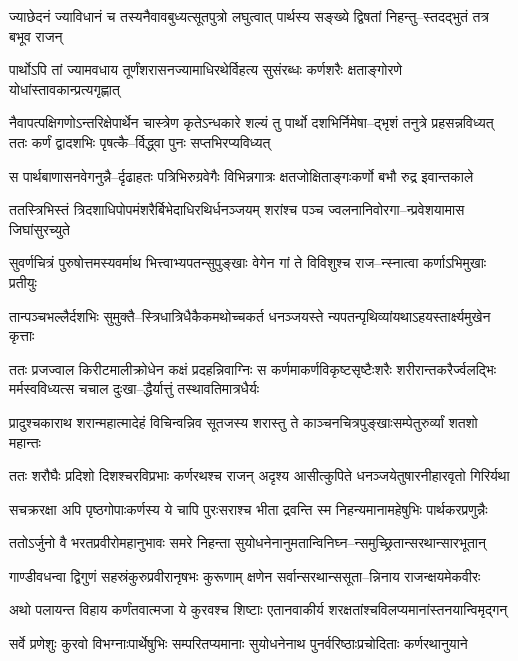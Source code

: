 \twolineshloka
{ज्याछेदनं ज्याविधानं च तस्यनैवावबुध्यत्सूतपुत्रो लघुत्वात्}
{पार्थस्य सङ्ख्ये द्विषतां निहन्तु--स्तदद्भुतं तत्र बभूव राजन्}


\twolineshloka
{पार्थोऽपि तां ज्यामवधाय तूर्णंशरासनज्यामाधिरथेर्विहत्य}
{सुसंरब्धः कर्णशरैः क्षताङ्गोरणे योधांस्तावकान्प्रत्यगृह्णात्}


नैवापत्पक्षिगणोऽन्तरिक्षेपार्थेन चास्त्रेण कृतेऽन्धकारे
\twolineshloka
{शल्यं तु पार्थो दशभिर्निमेषा--द्भृशं तनुत्रे प्रहसन्नविध्यत्}
{ततः कर्णं द्वादशभिः पृषत्कै--र्विद्ध्वा पुनः सप्तभिरप्यविध्यत्}


\twolineshloka
{स पार्थबाणासनवेगनुन्नै--र्दृढाहतः पत्रिभिरुग्रवेगैः}
{विभिन्नगात्रः क्षतजोक्षिताङ्गःकर्णो बभौ रुद्र इवान्तकाले}


\twolineshloka
{ततस्त्रिभिस्तं त्रिदशाधिपोपमंशरैर्बिभेदाधिरथिर्धनञ्जयम्}
{शरांश्च पञ्च ज्वलनानिवोरगा--न्प्रवेशयामास जिघांसुरच्युते}


\twolineshloka
{सुवर्णचित्रं पुरुषोत्तमस्यवर्माथ भित्त्वाभ्यपतन्सुपुङ्खाः}
{वेगेन गां ते विविशुश्च राज--न्स्नात्वा कर्णाऽभिमुखाः प्रतीयुः}


\twolineshloka
{तान्पञ्चभल्लैर्दशभिः सुमुक्तै--स्त्रिधात्रिधैकैकमथोच्चकर्त}
{धनञ्जयस्ते न्यपतन्पृथिव्यांयथाऽहयस्तार्क्ष्यमुखेन कृत्ताः}


\threelineshloka
{ततः प्रजज्वाल किरीटमालीक्रोधेन कक्षं प्रदहन्निवाग्निः}
{स कर्णमाकर्णविकृष्टसृष्टैःशरैः शरीरान्तकरैर्ज्वलद्भिः}
{मर्मस्वविध्यत्स चचाल दुःखा--द्धैर्यात्तुं तस्थावतिमात्रधैर्यः}


\twolineshloka
{प्रादुश्चकाराथ शरान्महात्मादेहं विचिन्वन्निव सूतजस्य}
{शरास्तु ते काञ्चनचित्रपुङ्खाःसम्पेतुरुर्व्यां शतशो महान्तः}


\twolineshloka
{ततः शरौघैः प्रदिशो दिशश्चरविप्रभाः कर्णरथश्च राजन्}
{अदृश्य आसीत्कुपिते धनञ्जयेतुषारनीहारवृतो गिरिर्यथा}


\twolineshloka
{सचक्ररक्षा अपि पृष्ठगोपाःकर्णस्य ये चापि पुरःसराश्च}
{भीता द्रवन्ति स्म निहन्यमानामहेषुभिः पार्थकरप्रणुन्नैः}


\twolineshloka
{ततोऽर्जुनो वै भरतप्रवीरोमहानुभावः समरे निहन्ता}
{सुयोधनेनानुमतान्विनिघ्न--न्समुच्छ्रितान्सरथान्सारभूतान्}


\twolineshloka
{गाण्डीवधन्वा द्विगुणं सहस्रंकुरुप्रवीरानृषभः कुरूणाम्}
{क्षणेन सर्वान्सरथान्ससूता--न्निनाय राजन्क्षयमेकवीरः}


\twolineshloka
{अथो पलायन्त विहाय कर्णंतवात्मजा ये कुरवश्च शिष्टाः}
{एतानवाकीर्य शरक्षतांश्चविलप्यमानांस्तनयान्विमृद्गन्}


\twolineshloka
{सर्वे प्रणेशुः कुरवो विभग्नाःपार्थेषुभिः सम्परितप्यमानाः}
{सुयोधनेनाथ पुनर्वरिष्ठाःप्रचोदिताः कर्णरथानुयाने}


